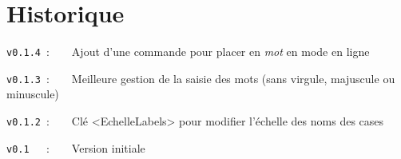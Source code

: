 \documentclass{article}
\begin{document}
\newpage

\part*{Historique}

\verb|v0.1.4|~:~~~~Ajout d'une commande pour placer en \textit{mot} en mode \og en ligne \fg

\verb|v0.1.3|~:~~~~Meilleure gestion de la saisie des mots (sans virgule, majuscule ou minuscule)

\verb|v0.1.2|~:~~~~Clé \textsf{<EchelleLabels>} pour modifier l'échelle des noms des cases

\verb|v0.1  |~:~~~~Version initiale
\end{document}
